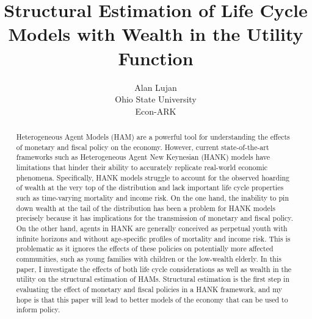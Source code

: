 \documentclass{article}
\title{Structural Estimation of Life Cycle Models with Wealth in the Utility Function}
\date{\displaydate{articleDate}}
\author{Alan Lujan\footnotemark[1]\\
Ohio State University\\Econ-ARK\\}
\begin{document}
\maketitle
{}

\begin{abstract}
Heterogeneous Agent Models (HAM) are a powerful tool for understanding the effects of monetary and fiscal policy on the economy. However, current state-of-the-art frameworks such as Heterogeneous Agent New Keynesian (HANK) models have limitations that hinder their ability to accurately replicate real-world economic phenomena. Specifically, HANK models struggle to account for the observed hoarding of wealth at the very top of the distribution and lack important life cycle properties such as time-varying mortality and income risk. On the one hand, the inability to pin down wealth at the tail of the distribution has been a problem for HANK models precisely because it has implications for the transmission of monetary and fiscal policy. On the other hand, agents in HANK are generally conceived as perpetual youth with infinite horizons and without age-specific profiles of mortality and income risk. This is problematic as it ignores the effects of these policies on potentially more affected communities, such as young families with children or the low-wealth elderly. In this paper, I investigate the effects of both life cycle considerations as well as wealth in the utility on the structural estimation of HAMs. Structural estimation is the first step in evaluating the effect of monetary and fiscal policies in a HANK framework, and my hope is that this paper will lead to better models of the economy that can be used to inform policy.
\end{abstract}

\end{document}
